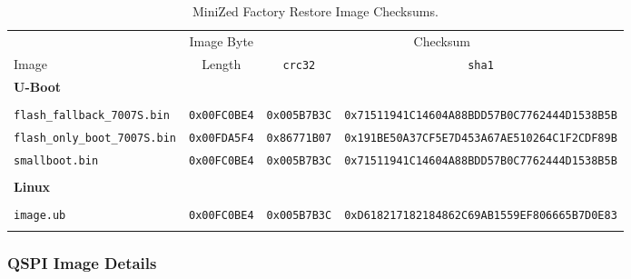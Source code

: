 %
\begin{landscape}
\begin{table}
\caption{MiniZed Factory Restore Image Checksums.}
\label{tab:factory_image_checksums}
\begin{center}
\begin{tabular}{|l|c|c|c|}
\hline
      & Image Byte & \multicolumn{2}{c|}{Checksum}\\
\cline{3-4}
Image & Length & \verb+crc32+ & \verb+sha1+\\
\hline
\multicolumn{4}{|l|}{\bf U-Boot}\\
\hline
&&&\\
\verb+flash_fallback_7007S.bin+  & \verb+0x00FC0BE4+ & \verb+0x005B7B3C+ & \verb+0x71511941C14604A88BDD57B0C7762444D1538B5B+\\
\verb+flash_only_boot_7007S.bin+ & \verb+0x00FDA5F4+ & \verb+0x86771B07+ & \verb+0x191BE50A37CF5E7D453A67AE510264C1F2CDF89B+\\
\verb+smallboot.bin+             & \verb+0x00FC0BE4+ & \verb+0x005B7B3C+ & \verb+0x71511941C14604A88BDD57B0C7762444D1538B5B+\\
&&&\\
\hline
\multicolumn{4}{|l|}{\bf Linux}\\
\hline
&&&\\
\verb+image.ub+ & \verb+0x00FC0BE4+ & \verb+0x005B7B3C+ & \verb+0xD618217182184862C69AB1559EF806665B7D0E83+\\
&&&\\
\hline
\end{tabular}
\end{center}
\end{table}
\end{landscape}

\subsubsection{QSPI Image Details}

